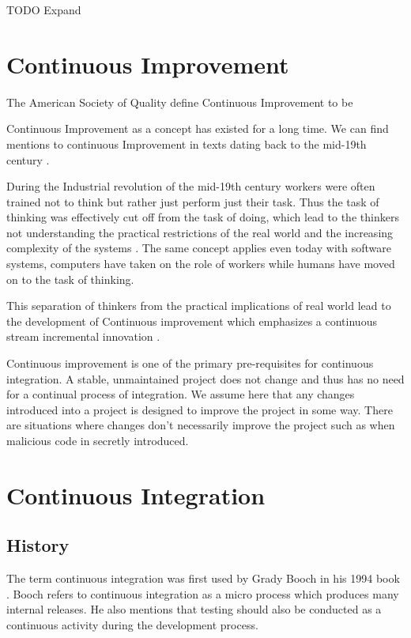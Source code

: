 \documentclass[12pt,conference]{IEEEtran}
\begin{document}
TODO Expand


\section*{Continuous Improvement}

The American Society of Quality define Continuous Improvement to be 
 \cite{american_society_for_quality_continuous_????}

Continuous Improvement as a concept has existed for a long time. We can find mentions to continuous Improvement in texts dating back to the mid-19th century \cite{schroeder_americas_????}. 

During the Industrial revolution of the mid-19th century workers were often trained not to think but rather just perform just their task. Thus the task of thinking was effectively cut off from the task of doing, which lead to the thinkers not understanding the practical restrictions of the real world and the increasing complexity of the systems \cite{schroeder_americas_????}. The same concept applies even today with software systems, computers have taken on the role of workers while humans have moved on to the task of thinking.

This separation of thinkers from the practical implications of real world lead to the development of Continuous improvement which emphasizes a continuous stream incremental innovation \cite{bessant_rediscovering_1994}.

Continuous improvement is one of the primary pre-requisites for continuous integration. A stable, unmaintained project does not change and thus has no need for a continual process of integration. We assume here that any changes introduced into a project is designed to improve the project in some way. There are situations where changes don't necessarily improve the project such as when malicious code in secretly introduced. 


\section*{Continuous Integration}

\subsection*{History}

The term continuous integration was first used by Grady Booch in his 1994 book \cite{booch_object-oriented_1994}. Booch refers to continuous integration as a micro process which produces many internal releases. He also mentions that testing should also be conducted as a continuous activity during the development process.
\end{document}
